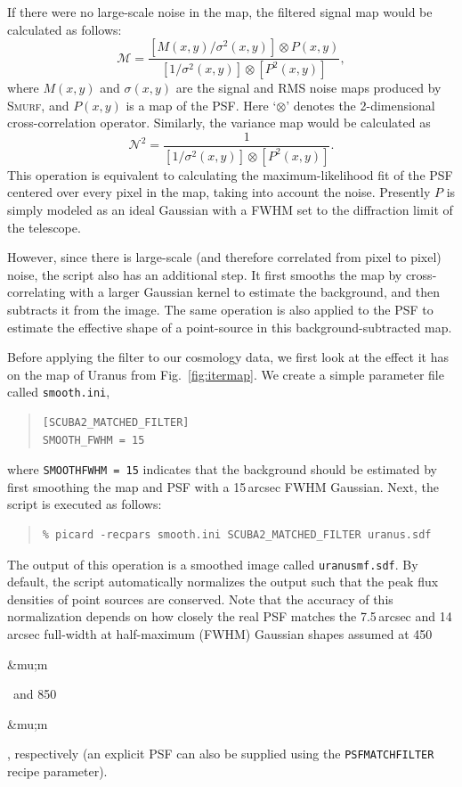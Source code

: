 \documentclass[twoside,11pt]{article}
\newcommand{\micron}{\mbox{\,${\umu}$m}}            %
\newcommand{\xref}[3]{#1}
\renewcommand{\_}{\texttt{\symbol{95}}}
\newenvironment{myquote}{\begin{quote}\begin{small}}{\end{small}\end{quote}}
\newcommand{\smurf}{\xref{\textsc{Smurf}}{sun258}{}}
\newcommand{\param}[1]{\texttt{#1}}
\renewcommand{\micron}{\begin{rawhtml}&mu;m\end{rawhtml}}
\begin{document}
If there were no large-scale noise in the map, the filtered signal map
would be calculated as follows:
%
\begin{equation}
\mathcal{M} = \frac{[M(x,y)/\sigma^2(x,y)] \otimes P(x,y)}
  {[1/\sigma^2(x,y)] \otimes [P^2(x,y)]},
\end{equation}
%
where $M(x,y)$ and $\sigma(x,y)$ are the signal and RMS
noise maps produced by \smurf, and $P(x,y)$ is a map of the
PSF. Here `$\otimes$' denotes the 2-dimensional cross-correlation
operator. Similarly, the variance map would be calculated as
%
\begin{equation}
  \mathcal{N}^2 = \frac{1}{[1/\sigma^2(x,y)] \otimes [P^2(x,y)]}.
\end{equation}
%
This operation is equivalent to calculating the maximum-likelihood fit
of the PSF centered over every pixel in the map, taking into account
the noise. Presently $P$ is simply modeled as an ideal Gaussian
with a FWHM set to the diffraction limit of the telescope.

However, since there is large-scale (and therefore correlated from
pixel to pixel) noise, the script also has an additional step. It
first smooths the map by cross-correlating with a larger Gaussian
kernel to estimate the background, and then subtracts it from the
image. The same operation is also applied to the PSF to estimate the
effective shape of a point-source in this background-subtracted map.

Before applying the filter to our cosmology data, we first look at the
effect it has on the map of Uranus from Fig.~\ref{fig:itermap}. We
create a simple parameter file called \texttt{smooth.ini},
\begin{myquote}
\begin{verbatim}
[SCUBA2_MATCHED_FILTER]
SMOOTH_FWHM = 15
\end{verbatim}
\end{myquote}
%
where \texttt{SMOOTH\_FWHM = 15} indicates that the background should
be estimated by first smoothing the map and PSF with a 15\,arcsec FWHM
Gaussian. Next, the script is executed as follows:
%
\begin{myquote}
\begin{verbatim}
% picard -recpars smooth.ini SCUBA2_MATCHED_FILTER uranus.sdf
\end{verbatim}
\end{myquote}
%
The output of this operation is a smoothed image called
\texttt{uranus\_mf.sdf}. By default, the script automatically
normalizes the output such that the peak flux densities of point
sources are conserved. Note that the accuracy of this normalization
depends on how closely the real PSF matches the 7.5\,arcsec and
14\,arcsec full-width at half-maximum (FWHM) Gaussian shapes assumed
at 450\micron\ and 850\micron, respectively (an explicit PSF can
also be supplied using the \param{PSF\_MATCHFILTER} recipe
parameter).
\end{document}
